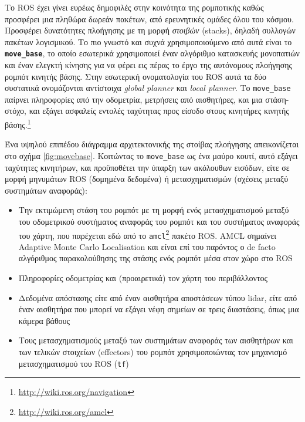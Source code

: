 Το ROS έχει γίνει ευρέως δημοφιλές στην κοινότητα της ρομποτικής καθώς
προσφέρει μια πληθώρα δωρεάν πακέτων, από ερευνητικές ομάδες όλου του κόσμου.
Προσφέρει δυνατότητες πλοήγησης με τη μορφή \textit{στοιβών} (stacks), δηλαδή
συλλογών πακέτων λογισμικού. Το πιο γνωστό και συχνά χρησιμοποιούμενο από αυτά
είναι το \texttt{\textbf{move\_base}}, το οποίο εσωτερικά χρησιμοποιεί έναν
αλγόριθμο κατασκευής μονοπατιών και έναν ελεγκτή κίνησης για να φέρει εις πέρας
το έργο της αυτόνομους πλοήγησης ρομπότ κινητής βάσης. Στην εσωτερική
ονοματολογία του ROS αυτά τα δύο συστατικά ονομάζονται αντίστοιχα
\textit{global planner} και \textit{local planner}. Το \texttt{move\_base}
παίρνει πληροφορίες από την οδομετρία, μετρήσεις από αισθητήρες, και μια
στάση-στόχο, και εξάγει ασφαλείς εντολές ταχύτητας προς είσοδο στους κινητήρες
κινητής βάσης.\footnote{\url{http://wiki.ros.org/navigation}}

Ένα υψηλού επιπέδου διάγραμμα αρχιτεκτονικής της στοίβας πλοήγησης
απεικονίζεται στο σχήμα \ref{fig:movebase}. Κοιτώντας το \texttt{move\_base} ως
ένα μαύρο κουτί, αυτό εξάγει ταχύτητες κινητήρων, και προϋποθέτει την ύπαρξη
των ακόλουθων εισόδων, είτε σε μορφή μηνυμάτων ROS (δομημένα δεδομένα) ή
μετασχηματισμών (σχέσεις μεταξύ συστημάτων αναφοράς):

\begin{itemize}
  \item Την εκτιμώμενη στάση του ρομπότ με τη μορφή ενός μετασχηματισμού μεταξύ
        του οδομετρικού συστήματος αναφοράς του ρομπότ και του συστήματος
        αναφοράς του χάρτη, που παρέχεται εδώ από το
        \texttt{amcl}\footnote{\url{http://wiki.ros.org/amcl}} πακέτο ROS.
        AMCL σημαίνει Adaptive Monte Carlo Localisation
        \cite{Grisetti2007,Fox2001} και είναι επί του παρόντος ο de facto
        αλγόριθμος παρακολούθησης της στάσης ενός ρομπότ μέσα στον χώρο στο ROS
  \item Πληροφορίες οδομετρίας και (προαιρετικά) τον χάρτη του περιβάλλοντος
  \item Δεδομένα απόστασης είτε από έναν αισθητήρα αποστάσεων τύπου lidar, είτε
        από έναν αισθητήρα που μπορεί να εξάγει νέφη σημείων σε τρεις
        διαστάσεις, όπως μια κάμερα βάθους
  \item Τους μετασχηματισμούς μεταξύ των συστημάτων αναφοράς
        των αισθητήρων και των τελικών στοιχείων (effectors) του ρομπότ
        χρησιμοποιώντας τον μηχανισμό μετασχηματισμού του ROS (\texttt{tf})
\end{itemize}

